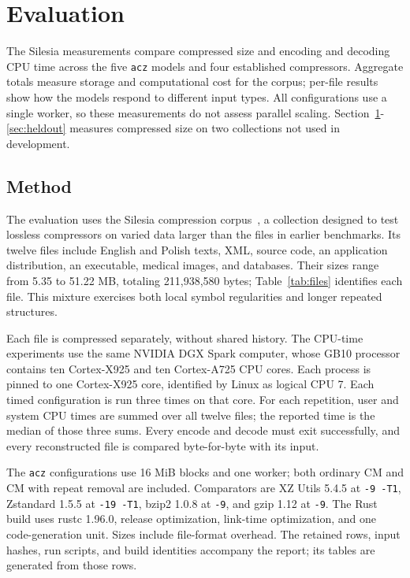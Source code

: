 \documentclass[10pt,letterpaper]{article}
\newcommand{\acz}{\texttt{acz}}
\newcommand{\code}[1]{\texttt{#1}}
\begin{document}
\section{Evaluation}\label{sec:evaluation}
The Silesia measurements compare compressed size and encoding and decoding CPU time across the five \acz{} models and four established compressors. Aggregate totals measure storage and computational cost for the corpus; per-file results show how the models respond to different input types. All configurations use a single worker, so these measurements do not assess parallel scaling. Section~\ref{sec:evaluation}-\ref{sec:heldout} measures compressed size on two collections not used in development.

\subsection{Method}\label{sec:method}
The evaluation uses the Silesia compression corpus~\cite{silesia}, a collection designed to test lossless compressors on varied data larger than the files in earlier benchmarks. Its twelve files include English and Polish texts, XML, source code, an application distribution, an executable, medical images, and databases. Their sizes range from 5.35 to 51.22 MB, totaling 211,938,580 bytes; Table~\ref{tab:files} identifies each file. This mixture exercises both local symbol regularities and longer repeated structures.

Each file is compressed separately, without shared history. The CPU-time experiments use the same NVIDIA DGX Spark computer, whose GB10 processor contains ten Cortex-X925 and ten Cortex-A725 CPU cores. Each process is pinned to one Cortex-X925 core, identified by Linux as logical CPU 7. Each timed configuration is run three times on that core. For each repetition, user and system CPU times are summed over all twelve files; the reported time is the median of those three sums. Every encode and decode must exit successfully, and every reconstructed file is compared byte-for-byte with its input.

The \acz{} configurations use 16 MiB blocks and one worker; both ordinary CM and CM with repeat removal are included. Comparators are XZ Utils 5.4.5 at \code{-9 -T1}, Zstandard 1.5.5 at \code{-19 -T1}, bzip2 1.0.8 at \code{-9}, and gzip 1.12 at \code{-9}. The Rust build uses rustc 1.96.0, release optimization, link-time optimization, and one code-generation unit. Sizes include file-format overhead. The retained rows, input hashes, run scripts, and build identities accompany the report; its tables are generated from those rows.
\end{document}
